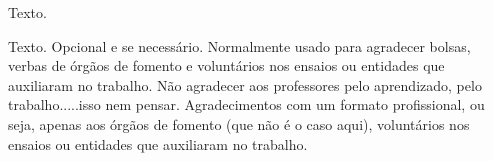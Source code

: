 
Texto.

Texto. Opcional e se necessário. Normalmente usado para agradecer bolsas, verbas de órgãos de fomento e voluntários nos ensaios ou entidades que auxiliaram no trabalho. Não agradecer aos professores pelo aprendizado, pelo trabalho.....isso nem pensar. Agradecimentos com um formato profissional, ou seja, apenas aos órgãos de fomento (que não é o caso aqui), voluntários nos ensaios ou entidades que auxiliaram no trabalho.